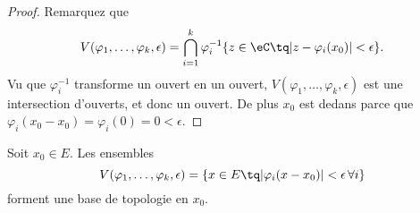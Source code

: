 \begin{proof}
	Remarquez que
	\begin{equation}
		V(\varphi_1,\ldots, \varphi_k,\epsilon)=\bigcap_{i=1}^k\varphi_i^{-1}\{ z\in \eC\tq | z-\varphi_i(x_0) | <\epsilon \}.
	\end{equation}
	Vu que \( \varphi_i^{-1}\) transforme un ouvert en un ouvert, \( V(\varphi_1,\ldots, \varphi_k,\epsilon)\) est une intersection d'ouverts, et donc un ouvert. De plus \( x_0\) est dedans parce que \( \varphi_i(x_0-x_0)=\varphi_i(0)=0 <\epsilon\).
\end{proof}

\begin{lemma}
	Soit \( x_0\in E\). Les ensembles
	\begin{equation}
		V(\varphi_1,\ldots, \varphi_k,\epsilon)=\{ x\in E\tq | \varphi_i(x-x_0) |<\epsilon\,\forall i \}
	\end{equation}
	forment une base de topologie en \( x_0\).
\end{lemma}


